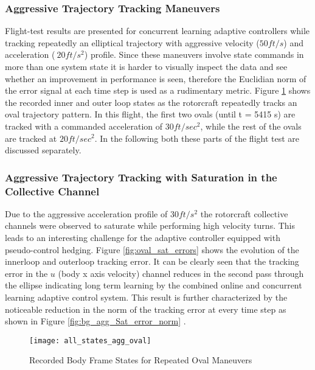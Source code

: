 \subsubsection{Aggressive Trajectory Tracking Maneuvers}
Flight-test results are presented for concurrent learning adaptive controllers while tracking repeatedly an elliptical trajectory with aggressive velocity ($50 ft/s$) and acceleration ($~20 ft/s^2$) profile. Since these maneuvers involve state commands in more than one system state it is harder to visually inspect the data and see whether an improvement in performance is seen, therefore the Euclidian norm of the error signal at each time step is used as a rudimentary metric. Figure \ref{fig:all_states_agg_ovals} shows the recorded inner and outer loop states as the rotorcraft repeatedly tracks an oval trajectory pattern. In this flight, the first two ovals (until t = 5415 s) are tracked with a commanded acceleration of $30ft/sec^2$, while the rest of the ovals are tracked at $20ft/sec^2$. In the following both these parts of the flight test are discussed separately.

\subsubsection{Aggressive Trajectory Tracking with Saturation in the Collective Channel}
\label{sec:bg_oval}
Due to the aggressive acceleration profile of $30ft/s^2$ the rotorcraft collective channels were observed to saturate while performing high velocity turns. This leads to an interesting challenge for the adaptive controller equipped with pseudo-control hedging. Figure \ref{fig:oval_sat_errors} shows the evolution of the innerloop and outerloop tracking error. It can be clearly seen that the tracking error in the $u$ (body x axis velocity) channel reduces in the second pass through the ellipse indicating long term learning by the combined online and concurrent learning adaptive control system. This result is further characterized by the noticeable reduction in the norm of the tracking error at every time step as shown in Figure \ref{fig:bg_agg_Sat_error_norm} .



\begin{figure}[h]
\centering
\texttt{[image: all\_states\_agg\_oval]}
\caption{Recorded Body Frame States for Repeated Oval Maneuvers}
\label{fig:all_states_agg_ovals}
\end{figure}

